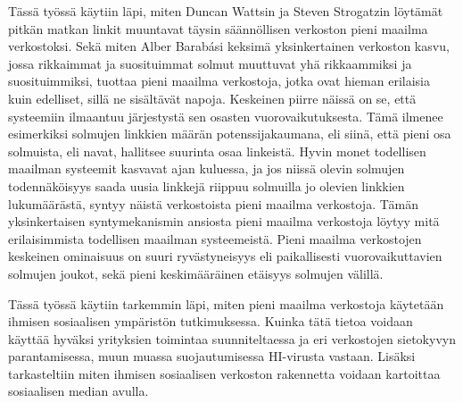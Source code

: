 \documentclass[finnish,12pt,a4paper,pdftex,elec,utf8]{aaltothesis}
\begin{document}
Tässä työssä käytiin läpi, miten Duncan Wattsin ja Steven Strogatzin löytämät pitkän matkan linkit muuntavat täysin säännöllisen verkoston pieni maailma verkostoksi. Sekä miten Alber Barabási keksimä yksinkertainen verkoston kasvu, jossa rikkaimmat ja suosituimmat solmut muuttuvat yhä rikkaammiksi ja suosituimmiksi, tuottaa pieni maailma verkostoja, jotka ovat hieman erilaisia kuin edelliset, sillä ne sisältävät napoja. Keskeinen piirre näissä on se, että systeemiin ilmaantuu järjestystä sen osasten vuorovaikutuksesta. Tämä ilmenee esimerkiksi solmujen linkkien määrän potenssijakaumana, eli siinä, että pieni osa solmuista, eli navat, hallitsee suurinta osaa linkeistä. Hyvin monet todellisen maailman systeemit kasvavat ajan kuluessa, ja jos niissä olevin solmujen todennäköisyys saada uusia linkkejä riippuu solmuilla jo olevien linkkien lukumäärästä, syntyy näistä verkostoista pieni maailma verkostoja. Tämän yksinkertaisen syntymekanismin ansiosta pieni maailma verkostoja löytyy mitä erilaisimmista todellisen maailman systeemeistä. Pieni maailma verkostojen keskeinen ominaisuus on suuri ryvästyneisyys eli paikallisesti vuorovaikuttavien solmujen joukot, sekä pieni keskimääräinen etäisyys solmujen välillä. 

Tässä työssä käytiin tarkemmin läpi, miten pieni maailma verkostoja käytetään ihmisen sosiaalisen ympäristön tutkimuksessa. Kuinka tätä tietoa voidaan käyttää hyväksi yrityksien toimintaa suunniteltaessa ja eri verkostojen sietokyvyn parantamisessa, muun muassa suojautumisessa HI-virusta vastaan. Lisäksi tarkasteltiin miten ihmisen sosiaalisen verkoston rakennetta voidaan kartoittaa sosiaalisen median avulla.



\clearpage


%
%
\printbibliography


\end{document}
